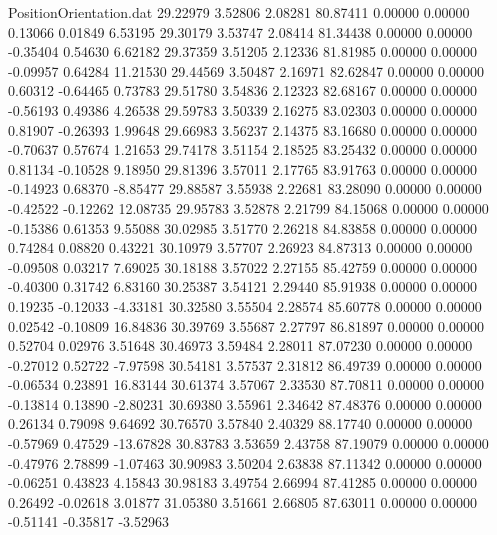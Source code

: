 \begin{filecontents}{PositionOrientation.dat}
  29.22979    3.52806    2.08281    80.87411    0.00000    0.00000    0.13066    0.01849    6.53195
  29.30179    3.53747    2.08414    81.34438    0.00000    0.00000   -0.35404    0.54630    6.62182
  29.37359    3.51205    2.12336    81.81985    0.00000    0.00000   -0.09957    0.64284   11.21530
  29.44569    3.50487    2.16971    82.62847    0.00000    0.00000    0.60312   -0.64465    0.73783
  29.51780    3.54836    2.12323    82.68167    0.00000    0.00000   -0.56193    0.49386    4.26538
  29.59783    3.50339    2.16275    83.02303    0.00000    0.00000    0.81907   -0.26393    1.99648
  29.66983    3.56237    2.14375    83.16680    0.00000    0.00000   -0.70637    0.57674    1.21653
  29.74178    3.51154    2.18525    83.25432    0.00000    0.00000    0.81134   -0.10528    9.18950
  29.81396    3.57011    2.17765    83.91763    0.00000    0.00000   -0.14923    0.68370   -8.85477
  29.88587    3.55938    2.22681    83.28090    0.00000    0.00000   -0.42522   -0.12262   12.08735
  29.95783    3.52878    2.21799    84.15068    0.00000    0.00000   -0.15386    0.61353    9.55088
  30.02985    3.51770    2.26218    84.83858    0.00000    0.00000    0.74284    0.08820    0.43221
  30.10979    3.57707    2.26923    84.87313    0.00000    0.00000   -0.09508    0.03217    7.69025
  30.18188    3.57022    2.27155    85.42759    0.00000    0.00000   -0.40300    0.31742    6.83160
  30.25387    3.54121    2.29440    85.91938    0.00000    0.00000    0.19235   -0.12033   -4.33181
  30.32580    3.55504    2.28574    85.60778    0.00000    0.00000    0.02542   -0.10809   16.84836
  30.39769    3.55687    2.27797    86.81897    0.00000    0.00000    0.52704    0.02976    3.51648
  30.46973    3.59484    2.28011    87.07230    0.00000    0.00000   -0.27012    0.52722   -7.97598
  30.54181    3.57537    2.31812    86.49739    0.00000    0.00000   -0.06534    0.23891   16.83144
  30.61374    3.57067    2.33530    87.70811    0.00000    0.00000   -0.13814    0.13890   -2.80231
  30.69380    3.55961    2.34642    87.48376    0.00000    0.00000    0.26134    0.79098    9.64692
  30.76570    3.57840    2.40329    88.17740    0.00000    0.00000   -0.57969    0.47529  -13.67828
  30.83783    3.53659    2.43758    87.19079    0.00000    0.00000   -0.47976    2.78899   -1.07463
  30.90983    3.50204    2.63838    87.11342    0.00000    0.00000   -0.06251    0.43823    4.15843
  30.98183    3.49754    2.66994    87.41285    0.00000    0.00000    0.26492   -0.02618    3.01877
  31.05380    3.51661    2.66805    87.63011    0.00000    0.00000   -0.51141   -0.35817   -3.52963

\end{filecontents}
